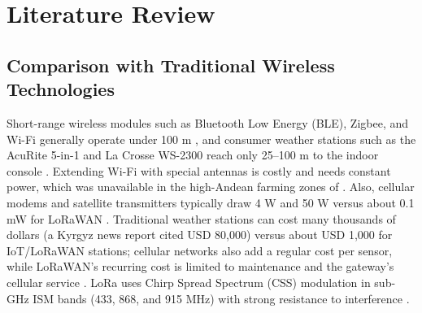 \documentclass[conference,onecolumn]{IEEEtran}
\begin{document}
\section{Literature Review}

\subsection{Comparison with Traditional Wireless Technologies}
Short-range wireless modules such as Bluetooth Low Energy (BLE), Zigbee, and Wi-Fi generally operate under 100 m \cite{murdyantoro2019}, and consumer weather stations such as the AcuRite 5-in-1 and La Crosse WS-2300 reach only 25--100 m to the indoor console \cite{pietrosemoli2019}. Extending Wi-Fi with special antennas is costly and needs constant power, which was unavailable in the high-Andean farming zones of \cite{lopez2025}. Also, cellular modems and satellite transmitters typically draw 4 W and 50 W versus about 0.1 mW for LoRaWAN \cite{zennaro2025}. Traditional weather stations can cost many thousands of dollars (a Kyrgyz news report cited USD 80,000) versus about USD 1,000 for IoT/LoRaWAN stations; cellular networks also add a regular cost per sensor, while LoRaWAN's recurring cost is limited to maintenance and the gateway's cellular service \cite{zennaro2025}. LoRa uses Chirp Spread Spectrum (CSS) modulation in sub-GHz ISM bands (433, 868, and 915 MHz) with strong resistance to interference \cite{lopez2025, murdyantoro2019}.
\end{document}
